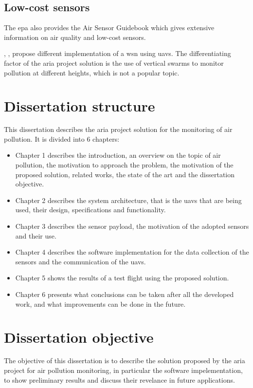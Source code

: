 \subsection{Low-cost sensors}
The \gls{epa} also provides the Air Sensor Guidebook\cite{williams2014-air} which gives extensive information on air quality and low-cost sensors.

\cite{evangelatos2015airborne}, \cite{8675167}, \cite{8662050} propose different implementation of a \gls{wsn} using \gls{uavs}. The differentiating factor of the \gls{aria} project solution is the use of vertical swarms to monitor pollution at different heights, which is not a popular topic.
\section{Dissertation structure}
This dissertation describes the \gls{aria} project solution for the monitoring of air pollution. It is divided into 6 chapters:
\begin{itemize}
    \item Chapter 1 describes the introduction, an overview on the topic of air pollution, the motivation to approach the problem, the motivation of the proposed solution, related works, the state of the art and the dissertation objective.
    \item Chapter 2 describes the system architecture, that is the \gls{uavs} that are being used, their design, specifications and functionality.
    \item Chapter 3 describes the sensor payload, the motivation of the adopted sensors and their use.
    \item Chapter 4 describes the software implementation for the data collection of the sensors and the communication of the \gls{uavs}.
    \item Chapter 5 shows the results of a test flight using the proposed solution.
    \item Chapter 6 presents what conclusions can be taken after all the developed work, and what improvements can be done in the future.
\end{itemize}
\section{Dissertation objective}
The objective of this dissertation is to describe the solution proposed by the \gls{aria} project for air pollution monitoring, in particular the software impelementation, to show preliminary results and discuss their revelance in future applications.